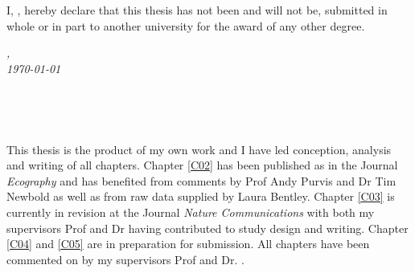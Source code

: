 %

\vspace*{5cm}

\begin{flushleft}
	\large{\noindent I, \myName, hereby declare that this thesis has not been and will not be, submitted in whole or in part to another university for the award of any other degree.}
\end{flushleft}

\vspace*{2cm}

\begin{minipage}{.45\linewidth}
	\begin{flushleft} %
		\textit{\myLocation,} \\
		\textit{\today}%
	\end{flushleft}
\end{minipage}
\hfill
\begin{minipage}{.45\linewidth}
	\begin{flushright} %
		\makebox[2.5in]{\hrulefill} \\
		\myName 
	\end{flushright}
\end{minipage}\\ [0.5cm]


\vspace*{4cm}

\begin{flushleft}
	\noindent This thesis is the product of my own work and I have led conception, analysis and writing of all chapters. Chapter \ref{C02} has been published as \cite{Jung2018} in the Journal \textit{Ecography} and has benefited from comments by Prof Andy Purvis and Dr Tim Newbold as well as from raw data supplied by Laura Bentley. Chapter \ref{C03} is currently in revision at the Journal \textit{Nature Communications} with both my supervisors Prof \myProf and Dr \myOtherProf having contributed to study design and writing. Chapter \ref{C04} and \ref{C05} are in preparation for submission. All chapters have been commented on by my supervisors Prof \myProf and Dr. \myOtherProf.
\end{flushleft}

